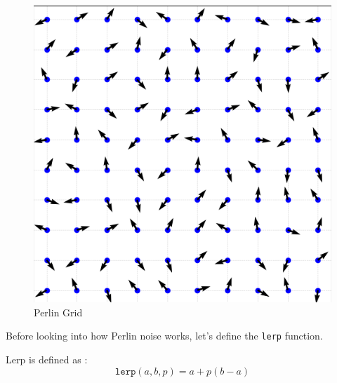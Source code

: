 \begin{figure}[H]
\begin{minipage}[t]{0.45\textwidth}
        \includegraphics[width=\textwidth]{images/perlin_grid.png}
        \caption{Perlin Grid}
        \label{fig:perlin_grid}
    \end{minipage}
\end{figure}


Before looking into how Perlin noise works, let's define the \texttt{lerp} function.
\begin{definition}
	Lerp is defined as :
	\[
		\texttt{lerp}(a, b, p) = a + p(b - a)
	\]
\end{definition}


